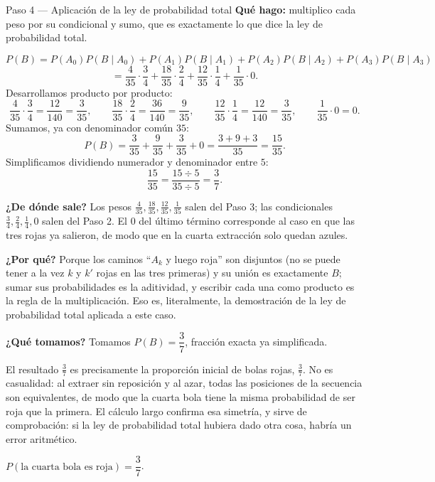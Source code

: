 \documentclass[11pt]{article}
\begin{document}
\begin{paso}{Paso 4 --- Aplicación de la ley de probabilidad total}
\textbf{Qué hago:} multiplico cada peso por su condicional y sumo, que es exactamente lo que dice la ley de probabilidad total.

\[
P(B)=P(A_0)P(B\mid A_0)+P(A_1)P(B\mid A_1)+P(A_2)P(B\mid A_2)+P(A_3)P(B\mid A_3)
\]
\[
=\frac{4}{35}\cdot\frac{3}{4}+\frac{18}{35}\cdot\frac{2}{4}+\frac{12}{35}\cdot\frac{1}{4}+\frac{1}{35}\cdot 0 .
\]
Desarrollamos producto por producto:
\[
\frac{4}{35}\cdot\frac{3}{4}=\frac{12}{140}=\frac{3}{35},
\qquad
\frac{18}{35}\cdot\frac{2}{4}=\frac{36}{140}=\frac{9}{35},
\qquad
\frac{12}{35}\cdot\frac{1}{4}=\frac{12}{140}=\frac{3}{35},
\qquad
\frac{1}{35}\cdot 0=0 .
\]
Sumamos, ya con denominador común $35$:
\[
P(B)=\frac{3}{35}+\frac{9}{35}+\frac{3}{35}+0=\frac{3+9+3}{35}=\frac{15}{35}.
\]
Simplificamos dividiendo numerador y denominador entre $5$:
\[
\frac{15}{35}=\frac{15\div 5}{35\div 5}=\frac{3}{7}.
\]

\textbf{¿De dónde sale?} Los pesos $\tfrac{4}{35},\tfrac{18}{35},\tfrac{12}{35},\tfrac{1}{35}$ salen del Paso 3; las condicionales $\tfrac34,\tfrac24,\tfrac14,0$ salen del Paso 2. El $0$ del último término corresponde al caso en que las tres rojas ya salieron, de modo que en la cuarta extracción solo quedan azules.

\textbf{¿Por qué?} Porque los caminos ``$A_k$ y luego roja'' son disjuntos (no se puede tener a la vez $k$ y $k'$ rojas en las tres primeras) y su unión es exactamente $B$; sumar sus probabilidades es la aditividad, y escribir cada una como producto es la regla de la multiplicación. Eso es, literalmente, la demostración de la ley de probabilidad total aplicada a este caso.

\textbf{¿Qué tomamos?} Tomamos $P(B)=\dfrac{3}{7}$, fracción exacta ya simplificada.
\end{paso}

\begin{nota}
El resultado $\tfrac37$ es precisamente la proporción inicial de bolas rojas, $\tfrac{3}{7}$. No es casualidad: al extraer sin reposición y al azar, todas las posiciones de la secuencia son equivalentes, de modo que la cuarta bola tiene la misma probabilidad de ser roja que la primera. El cálculo largo confirma esa simetría, y sirve de comprobación: si la ley de probabilidad total hubiera dado otra cosa, habría un error aritmético.
\end{nota}

\begin{resp}
$P(\text{la cuarta bola es roja})=\dfrac{3}{7}$.
\end{resp}
\end{document}
